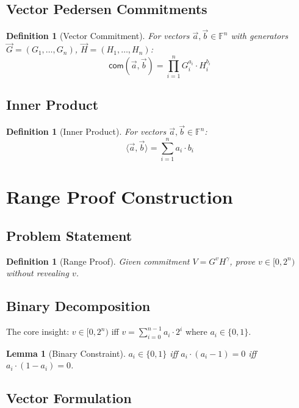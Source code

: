 \documentclass[11pt,a4paper]{article}
\newtheorem{lemma}[theorem]{Lemma}
\newtheorem{definition}[theorem]{Definition}
\newcommand{\F}{\mathbb{F}}
\newcommand{\com}{\mathsf{com}}
\begin{document}
\subsection{Vector Pedersen Commitments}

\begin{definition}[Vector Commitment]
For vectors $\vec{a}, \vec{b} \in \F^n$ with generators $\vec{G} = (G_1, \ldots, G_n)$, $\vec{H} = (H_1, \ldots, H_n)$:
\[
\com(\vec{a}, \vec{b}) = \prod_{i=1}^n G_i^{a_i} \cdot H_i^{b_i}
\]
\end{definition}

\subsection{Inner Product}

\begin{definition}[Inner Product]
For vectors $\vec{a}, \vec{b} \in \F^n$:
\[
\langle \vec{a}, \vec{b} \rangle = \sum_{i=1}^n a_i \cdot b_i
\]
\end{definition}

\section{Range Proof Construction}
\label{sec:range-proofs}

\subsection{Problem Statement}

\begin{definition}[Range Proof]
Given commitment $V = G^v H^{\gamma}$, prove $v \in [0, 2^n)$ without revealing $v$.
\end{definition}

\subsection{Binary Decomposition}

The core insight: $v \in [0, 2^n)$ iff $v = \sum_{i=0}^{n-1} a_i \cdot 2^i$ where $a_i \in \{0, 1\}$.

\begin{lemma}[Binary Constraint]
$a_i \in \{0, 1\}$ iff $a_i \cdot (a_i - 1) = 0$ iff $a_i \cdot (1 - a_i) = 0$.
\end{lemma}

\subsection{Vector Formulation}
\end{document}
